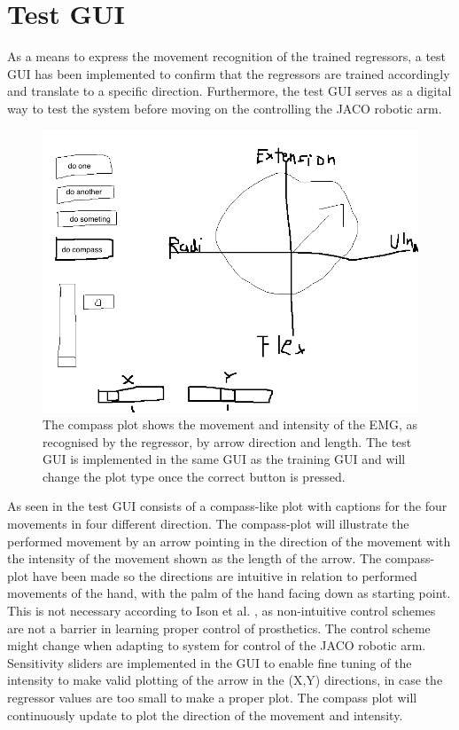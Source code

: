 \section{Test GUI}

As a means to express the movement recognition of the trained regressors, a test GUI has been implemented to confirm that the regressors are trained accordingly and translate to a specific direction. Furthermore, the test GUI serves as a digital way to test the system before moving on the controlling the JACO robotic arm. 

\begin{figure}[H]
	\includegraphics[width=.4\textwidth]{figures/GUI/GUI_test.png}  %
	\caption{The compass plot shows the movement and intensity of the EMG, as recognised by the regressor, by arrow direction and length. The test GUI is implemented in the same GUI as the training GUI and will change the plot type once the correct button is pressed.}
	\label{fig:testGUI}
\end{figure}

As seen in  the test GUI consists of a compass-like plot with captions for the four movements in four different direction. The compass-plot will illustrate the performed movement by an arrow pointing in the direction of the movement with the intensity of the movement shown as the length of the arrow. The compass-plot have been made so the directions are intuitive in relation to performed movements of the hand, with the palm of the hand facing down as starting point. This is not necessary according to Ison et al. \cite{Ison2016}, as non-intuitive control schemes are not a barrier in learning proper control of prosthetics. The control scheme might change when adapting to system for control of the JACO robotic arm. Sensitivity sliders are implemented in the GUI to enable fine tuning of the intensity to make valid plotting of the arrow in the (X,Y) directions, in case the regressor values are too small to make a proper plot. 
The compass plot will continuously update to plot the direction of the movement and intensity. 
